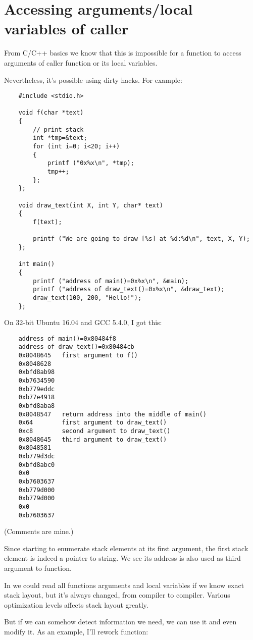 \section{Accessing arguments/local variables of caller}

From C/C++ basics we know that this is impossible for a function to access arguments of caller function or its
local variables.

Nevertheless, it's possible using dirty hacks.
For example:

\begin{lstlisting}
	#include <stdio.h>

	void f(char *text)
	{
		// print stack
		int *tmp=&text;
		for (int i=0; i<20; i++)
		{
			printf ("0x%x\n", *tmp);
			tmp++;
		};
	};

	void draw_text(int X, int Y, char* text)
	{
		f(text);

		printf ("We are going to draw [%s] at %d:%d\n", text, X, Y);
	};

	int main()
	{
		printf ("address of main()=0x%x\n", &main);
		printf ("address of draw_text()=0x%x\n", &draw_text);
		draw_text(100, 200, "Hello!");
	};
\end{lstlisting}

On 32-bit Ubuntu 16.04 and GCC 5.4.0, I got this:

\begin{lstlisting}
	address of main()=0x80484f8
	address of draw_text()=0x80484cb
	0x8048645	first argument to f()
	0x8048628
	0xbfd8ab98
	0xb7634590
	0xb779eddc
	0xb77e4918
	0xbfd8aba8
	0x8048547	return address into the middle of main()
	0x64		first argument to draw_text()
	0xc8		second argument to draw_text()
	0x8048645	third argument to draw_text()
	0x8048581
	0xb779d3dc
	0xbfd8abc0
	0x0
	0xb7603637
	0xb779d000
	0xb779d000
	0x0
	0xb7603637
\end{lstlisting}

(Comments are mine.)

Since  starting to enumerate stack elements at its first argument, the first stack element is indeed a pointer
to  string. We see its address is also used as third argument to  function.

In  we could read all functions arguments and local variables if we know exact stack layout, but it's always
changed, from compiler to compiler.
Various optimization levels affects stack layout greatly.

But if we can somehow detect information we need, we can use it and even modify it.
As an example, I'll rework  function:

